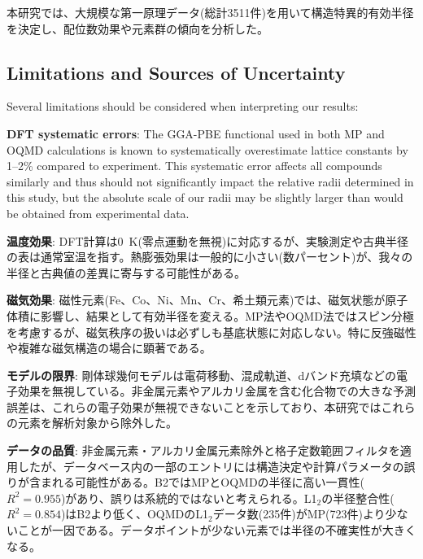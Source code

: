 \documentclass[a4paper,10pt,5p]{elsarticle}
\begin{document}
本研究では、大規模な第一原理データ(総計3511件)を用いて構造特異的有効半径を決定し、配位数効果や元素群の傾向を分析した。



\subsection{Limitations and Sources of Uncertainty}

Several limitations should be considered when interpreting our results:

\textbf{DFT systematic errors}: 
The GGA-PBE functional used in both MP and OQMD calculations is known to systematically overestimate lattice constants by 1--2\% compared to experiment. This systematic error affects all compounds similarly and thus should not significantly impact the relative radii determined in this study, but the absolute scale of our radii may be slightly larger than would be obtained from experimental data.

\textbf{温度効果}: DFT計算は0~K(零点運動を無視)に対応するが、実験測定や古典半径の表は通常室温を指す。熱膨張効果は一般的に小さい(数パーセント)が、我々の半径と古典値の差異に寄与する可能性がある。

\textbf{磁気効果}: 磁性元素(Fe、Co、Ni、Mn、Cr、希土類元素)では、磁気状態が原子体積に影響し、結果として有効半径を変える。MP法やOQMD法ではスピン分極を考慮するが、磁気秩序の扱いは必ずしも基底状態に対応しない。特に反強磁性や複雑な磁気構造の場合に顕著である。

\textbf{モデルの限界}: 剛体球幾何モデルは電荷移動、混成軌道、dバンド充填などの電子効果を無視している。非金属元素やアルカリ金属を含む化合物での大きな予測誤差は、これらの電子効果が無視できないことを示しており、本研究ではこれらの元素を解析対象から除外した。

\textbf{データの品質}: 非金属元素・アルカリ金属元素除外と格子定数範囲フィルタを適用したが、データベース内の一部のエントリには構造決定や計算パラメータの誤りが含まれる可能性がある。B2ではMPとOQMDの半径に高い一貫性($R^2 = 0.955$)があり、誤りは系統的ではないと考えられる。L1$_2$の半径整合性($R^2 = 0.854$)はB2より低く、OQMDのL1$_2$データ数(235件)がMP(723件)より少ないことが一因である。データポイントが少ない元素では半径の不確実性が大きくなる。
\end{document}
